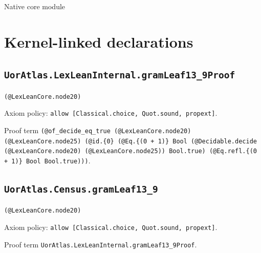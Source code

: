 \documentclass[11pt]{article}
\begin{document}
\begin{center}{\LARGE Native core module}\end{center}
\section*{Kernel-linked declarations}
\subsection*{\texttt{UorAtlas.LexLeanInternal.gramLeaf13\_9Proof}}
\noindent\texttt{(@LexLeanCore.node20)}\par
\noindent Axiom policy: \texttt{allow [Classical.choice, Quot.sound, propext]}.\par
\noindent Proof term \texttt{(@of\_decide\_eq\_true (@LexLeanCore.node20) (@LexLeanCore.node25) (@id.\{0\} (@Eq.\{(0 + 1)\} Bool (@Decidable.decide (@LexLeanCore.node20) (@LexLeanCore.node25)) Bool.true) (@Eq.refl.\{(0 + 1)\} Bool Bool.true)))}.\par
\subsection*{\texttt{UorAtlas.Census.gramLeaf13\_9}}
\noindent\texttt{(@LexLeanCore.node20)}\par
\noindent Axiom policy: \texttt{allow [Classical.choice, Quot.sound, propext]}.\par
\noindent Proof term \texttt{UorAtlas.LexLeanInternal.gramLeaf13\_9Proof}.\par
\end{document}
